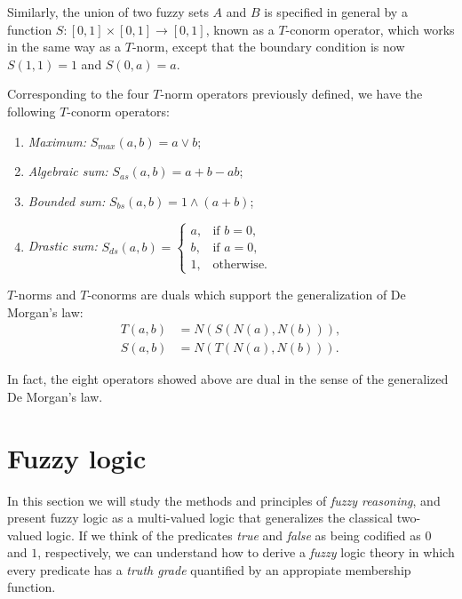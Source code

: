 \begin{definition} Similarly, the union of two fuzzy sets $A$ and $B$ is specified in general by a function $S:[0,1]\times [0,1] \to [0,1]$, known as a $T$-conorm operator, which works in the same way as a $T$-norm, except that the boundary condition is now $S(1,1) = 1$ and $S(0,a) = a$.

\end{definition}

Corresponding to the four $T$-norm operators previously defined, we have the following $T$-conorm operators:

\begin{enumerate}
	\item \textit{Maximum:} $S_{max}(a,b) = a \lor b$;
	\item \textit{Algebraic sum:} $S_{as}(a,b)=a + b - ab$;
	\item \textit{Bounded sum:} $S_{bs}(a,b) = 1 \land (a+b)$;
	\item \textit{Drastic sum:} $S_{ds}(a,b) = \begin{cases}
	                                      a, & \text{if } b = 0,\\
	                                      b, & \text{if } a = 0,\\
	                                      1, & \text{otherwise}.
                                          \end{cases}$
\end{enumerate}

\begin{theorem} $T$-norms and $T$-conorms are duals which support the generalization of De Morgan's law:
\begin{align*}
	T(a,b) &= N(S(N(a),N(b))),\\
	S(a,b) &= N(T(N(a), N(b))).
\end{align*}

\end{theorem}

In fact, the eight operators showed above are dual in the sense of the generalized De Morgan's law.

\section{Fuzzy logic}

In this section we will study the methods and principles of \textit{fuzzy reasoning}, and present fuzzy logic as a multi-valued logic that generalizes the classical two-valued logic. If we think of the predicates \textit{true} and \textit{false} as being codified as $0$ and $1$, respectively, we can understand how to derive a \textit{fuzzy} logic theory in which every predicate has a \textit{truth grade} quantified by an appropiate membership function.

